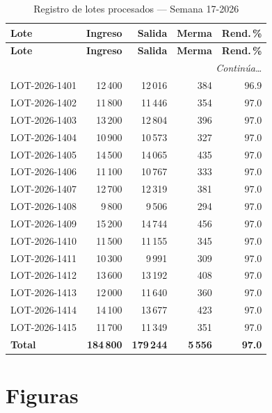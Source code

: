 \documentclass{../base/canon}
\begin{document}
\begin{center}
\begin{longtable}{@{} l r r r r @{}}
  \caption{Registro de lotes procesados — Semana 17-2026} \\
  \toprule
  \textbf{Lote} & \textbf{Ingreso} & \textbf{Salida} & \textbf{Merma} & \textbf{Rend.\,\%} \\
  \midrule
  \endfirsthead
  \toprule
  \textbf{Lote} & \textbf{Ingreso} & \textbf{Salida} & \textbf{Merma} & \textbf{Rend.\,\%} \\
  \midrule
  \endhead
  \midrule
  \multicolumn{5}{r}{\small\itshape Continúa\ldots} \\
  \endfoot
  \bottomrule
  \endlastfoot
  LOT-2026-1401 & 12\,400 & 12\,016 & 384 & 96.9 \\
  LOT-2026-1402 & 11\,800 & 11\,446 & 354 & 97.0 \\
  LOT-2026-1403 & 13\,200 & 12\,804 & 396 & 97.0 \\
  LOT-2026-1404 & 10\,900 & 10\,573 & 327 & 97.0 \\
  LOT-2026-1405 & 14\,500 & 14\,065 & 435 & 97.0 \\
  LOT-2026-1406 & 11\,100 & 10\,767 & 333 & 97.0 \\
  LOT-2026-1407 & 12\,700 & 12\,319 & 381 & 97.0 \\
  LOT-2026-1408 &  9\,800 &  9\,506 & 294 & 97.0 \\
  LOT-2026-1409 & 15\,200 & 14\,744 & 456 & 97.0 \\
  LOT-2026-1410 & 11\,500 & 11\,155 & 345 & 97.0 \\
  LOT-2026-1411 & 10\,300 &  9\,991 & 309 & 97.0 \\
  LOT-2026-1412 & 13\,600 & 13\,192 & 408 & 97.0 \\
  LOT-2026-1413 & 12\,000 & 11\,640 & 360 & 97.0 \\
  LOT-2026-1414 & 14\,100 & 13\,677 & 423 & 97.0 \\
  LOT-2026-1415 & 11\,700 & 11\,349 & 351 & 97.0 \\
  \midrule
  \textbf{Total} & \textbf{184\,800} & \textbf{179\,244} & \textbf{5\,556} & \textbf{97.0} \\
\end{longtable}
\end{center}

\section{Figuras}
\end{document}
